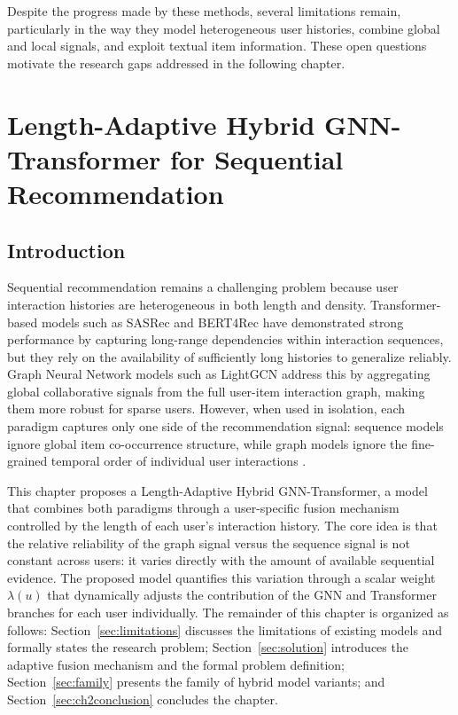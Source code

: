 \documentclass[12pt,a4paper]{report}
\begin{document}
Despite the progress made by these methods, several limitations remain,
particularly in the way they model heterogeneous user histories, combine
global and local signals, and exploit textual item information. These open
questions motivate the research gaps addressed in the following chapter.


\chapter{Length-Adaptive Hybrid GNN-Transformer for Sequential Recommendation}

\section{Introduction}

\justifying
Sequential recommendation remains a challenging problem because user interaction
histories are heterogeneous in both length and density. Transformer-based models
such as SASRec \citep{kang2018sasrec} and BERT4Rec \citep{sun2019bert4rec} have
demonstrated strong performance by capturing long-range dependencies within
interaction sequences, but they rely on the availability of sufficiently long
histories to generalize reliably. Graph Neural Network models such as LightGCN
\citep{he2020lightgcn} address this by aggregating global collaborative signals
from the full user-item interaction graph, making them more robust for sparse
users. However, when used in isolation, each paradigm captures only one side of
the recommendation signal: sequence models ignore global item co-occurrence
structure, while graph models ignore the fine-grained temporal order of
individual user interactions \citep{wu2020gnnsurvey, pan2024survey}.

This chapter proposes a Length-Adaptive Hybrid GNN-Transformer, a model that
combines both paradigms through a user-specific fusion mechanism controlled by
the length of each user's interaction history. The core idea is that the
relative reliability of the graph signal versus the sequence signal is not
constant across users: it varies directly with the amount of available
sequential evidence. The proposed model quantifies this variation through a
scalar weight \(\lambda(u)\) that dynamically adjusts the contribution of the
GNN and Transformer branches for each user individually. The remainder of this
chapter is organized as follows: Section~\ref{sec:limitations} discusses the
limitations of existing models and formally states the research problem;
Section~\ref{sec:solution} introduces the adaptive fusion mechanism and the
formal problem definition; Section~\ref{sec:family} presents the family of
hybrid model variants; and Section~\ref{sec:ch2conclusion} concludes the
chapter.
\end{document}
